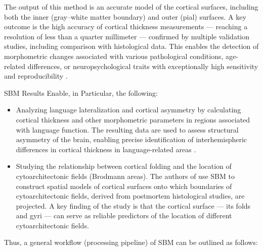 \documentclass[default]{subfiles}
\begin{document}
The output of this method is an accurate model of the cortical surfaces, including both the inner (gray–white matter
boundary) and outer (pial) surfaces. A key outcome is the high accuracy of cortical thickness measurements — reaching a
resolution of less than a quarter millimeter — confirmed by multiple validation studies, including comparison with
histological data. This enables the detection of morphometric changes associated with various pathological conditions,
age-related differences, or neuropsychological traits with exceptionally high sensitivity and reproducibility
\cite{has_2016}.

SBM Results Enable, in Particular, the following:
\begin{itemize}
    \item Analyzing language lateralization and cortical asymmetry by calculating cortical thickness and other
    morphometric parameters in regions associated with language function. The resulting data are used to assess
    structural asymmetry of the brain, enabling precise identification of interhemispheric differences in cortical
    thickness in language-related areas \cite{greve_2013}.
    
    \item Studying the relationship between cortical folding and the location of cytoarchitectonic fields
    (Brodmann areas). The authors of \cite{fischl_2008} use SBM to construct spatial models of cortical surfaces onto
    which boundaries of cytoarchitectonic fields, derived from postmortem histological studies, are projected. A key
    finding of the study is that the cortical surface — its folds and gyri — can serve as reliable predictors of the
    location of different cytoarchitectonic fields.
\end{itemize}

Thus, a general workflow (processing pipeline) of SBM can be outlined as follows:\newline
\end{document}
